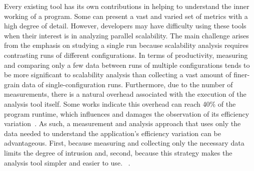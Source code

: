 Every existing tool has its own contributions in helping to understand the inner working of a program. Some can present a vast and varied set of metrics with a high degree of detail. 
However, developers may have difficulty using these tools when their interest is in analyzing parallel scalability. 
The main challenge arises from the emphasis on studying a single run because scalability analysis requires contrasting runs of different configurations.
In terms of productivity, measuring and comparing only a few data between runs of multiple configurations tends to be more significant to scalability analysis than collecting a vast amount of finer-grain data of single-configuration runs.
Furthermore, due to the number of measurements, there is a natural overhead associated with the execution of the analysis tool itself. Some works indicate this overhead can reach 40\% of the program runtime, which influences and damages the observation of its efficiency variation~\cite{Eriksson2016}.
As such, a measurement and analysis approach that uses only the data needed to understand the application's efficiency variation can be advantageous. First, because measuring and collecting only the necessary data limits the degree of intrusion and, second, because this strategy makes the analysis tool simpler and easier to use. 
~\cite{Shende2006}.


